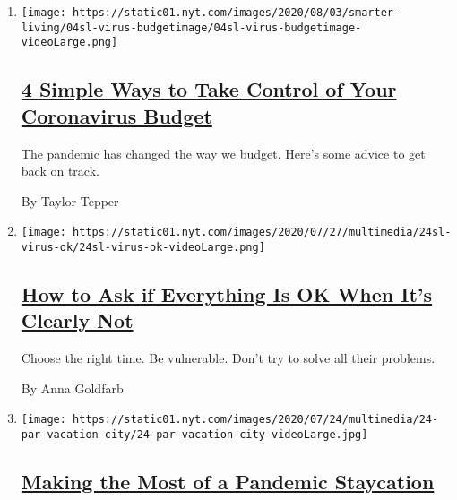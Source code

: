 \begin{enumerate}
\def\labelenumi{\arabic{enumi}.}
\item
  \texttt{[image: https://static01.nyt.com/images/2020/08/03/smarter-living/04sl-virus-budgetimage/04sl-virus-budgetimage-videoLarge.png]}

  \hypertarget{4-simple-ways-to-take-control-of-your-coronavirus-budget}{%
  \subsection{\texorpdfstring{\href{/2020/08/03/smarter-living/coronavirus-budget-save-money.html}{4
  Simple Ways to Take Control of Your Coronavirus
  Budget}}{4 Simple Ways to Take Control of Your Coronavirus Budget}}\label{4-simple-ways-to-take-control-of-your-coronavirus-budget}}

  The pandemic has changed the way we budget. Here's some advice to get
  back on track.

  By Taylor Tepper
\item
  \texttt{[image: https://static01.nyt.com/images/2020/07/27/multimedia/24sl-virus-ok/24sl-virus-ok-videoLarge.png]}

  \hypertarget{how-to-ask-if-everything-is-ok-when-its-clearly-not}{%
  \subsection{\texorpdfstring{\href{/2020/07/28/smarter-living/coronavirus-how-to-check-in-with-a-friend.html}{How
  to Ask if Everything Is OK When It's Clearly
  Not}}{How to Ask if Everything Is OK When It's Clearly Not}}\label{how-to-ask-if-everything-is-ok-when-its-clearly-not}}

  Choose the right time. Be vulnerable. Don't try to solve all their
  problems.

  By Anna Goldfarb
\item
  \texttt{[image: https://static01.nyt.com/images/2020/07/24/multimedia/24-par-vacation-city/24-par-vacation-city-videoLarge.jpg]}

  \hypertarget{making-the-most-of-a-pandemic-staycation}{%
  \subsection{\texorpdfstring{\href{/2020/07/24/parenting/summer-staycation-coronavirus.html}{Making
  the Most of a Pandemic
  Staycation}}{Making the Most of a Pandemic Staycation}}\label{making-the-most-of-a-pandemic-staycation}}


\end{enumerate}
